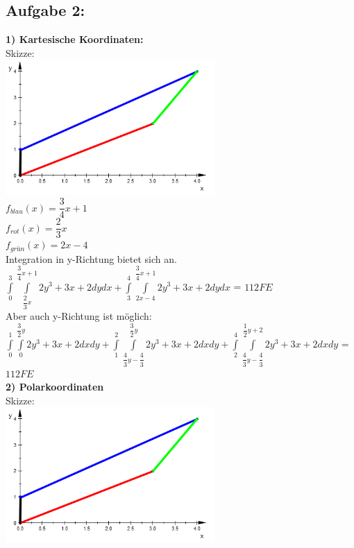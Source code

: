 \documentclass[11pt,final]{scrreprt}
\begin{document}
\subsection{Aufgabe 2:}
\textbf{1) Kartesische Koordinaten:}\\
Skizze:\\
\includegraphics[width=8cm]{images/ana2klausur/a2b1.png}\\
$ f_{blau}(x) = \dfrac{3}{4}x+1 $\\
$ f_{rot}(x) = \dfrac{2}{3}x$\\
$ f_{grün}(x) = 2x-4 $\\

Integration in y-Richtung bietet sich an.\\
$ \int\limits_0^3\int\limits_{\dfrac{2}{3}x}^{\dfrac{3}{4}x+1} 2y^3+3x+2 dy dx + \int\limits_3^4\int\limits_{2x-4}^{\dfrac{3}{4}x+1} 2y^3+3x+2 dy dx $ = $112 FE$\\

Aber auch y-Richtung ist möglich:\\
$\int\limits_0^1\int\limits_{0}^{\dfrac{3}{2}y} 2y^3+3x+2 dx dy + \int\limits_1^2\int\limits_{\dfrac{4}{3}y-\dfrac{4}{3}}^{\dfrac{3}{2}y} 2y^3+3x+2 dx dy + \int\limits_2^4\int\limits_{\dfrac{4}{3}y-\dfrac{4}{3}}^{\dfrac{1}{2}y + 2} 2y^3+3x+2 dx dy$ = $112 FE$\\

\textbf{2) Polarkoordinaten}\\
Skizze:\\
\includegraphics[width=8cm]{images/ana2klausur/a2b1.png}\\
\end{document}
